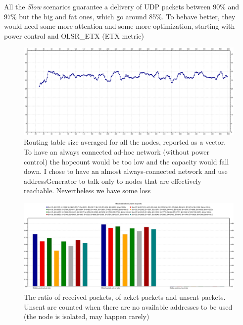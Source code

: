\documentclass[12pt, a4]{article}
\theoremstyle{definition}
\begin{document}
All the \emph{Slow} scenarios guarantee a delivery of UDP packets between 90\%
and 97\% but the big and fat ones, which go around 85\%. To behave better, they
would need some more attention and some more optimization, starting with power
control and OLSR\_ETX (ETX metric)

\begin{figure}
\begin{center}
\includegraphics[scale=0.35, angle=90]{images/AdHocLittleAreaFastSquaredRouting}
\caption{Routing table size averaged for all the nodes, reported as a vector. To have an always
connected ad-hoc network (without power control) the hopcount would be too low
and the capacity would fall down. I chose to have an almost always-connected
network and use addressGenerator to talk only to nodes that are effectively
reachable. Nevertheless we have some loss}
\end{center}
\end{figure}

\begin{figure}
\begin{center}
\includegraphics[scale=0.35, angle=90]{images/AdHocLittleAreaFastSquared}
\caption{The ratio of received packets, of acket packets and unsent packets.
Unsent are counted when there are no available addresses to be used (the node is
isolated, may happen rarely)}
\end{center}
\end{figure}
\end{document}
